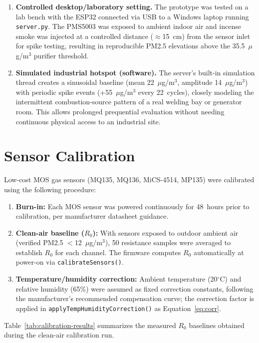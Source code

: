 \begin{enumerate}
    \item \textbf{Controlled desktop/laboratory setting.} The prototype was tested on a lab bench with the ESP32 connected via USB to a Windows laptop running \texttt{server.py}. The PMS5003 was exposed to ambient indoor air and incense smoke was injected at a controlled distance ($\approx$15~cm) from the sensor inlet for spike testing, resulting in reproducible PM2.5 elevations above the 35.5~$\mu$g/m$^3$ purifier threshold.
    \item \textbf{Simulated industrial hotspot (software).} The server's built-in simulation thread creates a sinusoidal baseline (mean 22~$\mu$g/m$^3$, amplitude 14~$\mu$g/m$^3$) with periodic spike events (+55~$\mu$g/m$^3$ every 22~cycles), closely modeling the intermittent combustion-source pattern of a real welding bay or generator room. This allows prolonged prequential evaluation without needing continuous physical access to an industrial site.
\end{enumerate}

\section{Sensor Calibration}
\label{sec:exp-calibration}

Low-cost MOS gas sensors (MQ135, MQ136, MiCS-4514, MP135) were calibrated using the following procedure:

\begin{enumerate}
    \item \textbf{Burn-in:} Each MOS sensor was powered continuously for 48~hours prior to calibration, per manufacturer datasheet guidance.
    \item \textbf{Clean-air baseline ($R_0$):} With sensors exposed to outdoor ambient air (verified PM2.5 $<$12~$\mu$g/m$^3$), 50 resistance samples were averaged to establish $R_0$ for each channel. The firmware computes $R_0$ automatically at power-on via \texttt{calibrateSensors()}.
    \item \textbf{Temperature/humidity correction:} Ambient temperature (20$^\circ$C) and relative humidity (65\%) were assumed as fixed correction constants, following the manufacturer's recommended compensation curve; the correction factor is applied in \texttt{applyTempHumidityCorrection()} as Equation~\ref{eq:corr}.
\end{enumerate}

Table~\ref{tab:calibration-results} summarizes the measured $R_0$ baselines obtained during the clean-air calibration run.

